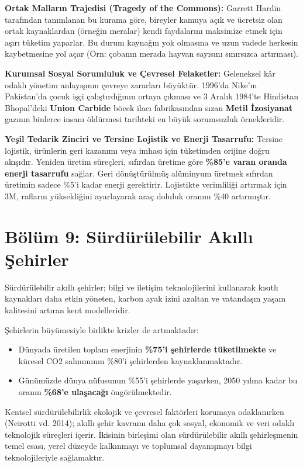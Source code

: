 \documentclass[11pt,a4paper,openany]{book}
\begin{document}
\textbf{Ortak Malların Trajedisi (Tragedy of the Commons):} Garrett Hardin tarafından tanımlanan bu kurama göre, bireyler kamuya açık ve ücretsiz olan ortak kaynaklardan (örneğin meralar) kendi faydalarını maksimize etmek için aşırı tüketim yaparlar. Bu durum kaynağın yok olmasına ve uzun vadede herkesin kaybetmesine yol açar (Örn: çobanın merada hayvan sayısını sınırsızca artırması).

\textbf{Kurumsal Sosyal Sorumluluk ve Çevresel Felaketler:} Geleneksel kâr odaklı yönetim anlayışının çevreye zararları büyüktür. 1996'da Nike'ın Pakistan'da çocuk işçi çalıştırdığının ortaya çıkması ve 3 Aralık 1984'te Hindistan Bhopal'deki \textbf{Union Carbide} böcek ilacı fabrikasından sızan \textbf{Metil İzosiyanat} gazının binlerce insanı öldürmesi tarihteki en büyük sorumsuzluk örnekleridir.

\textbf{Yeşil Tedarik Zinciri ve Tersine Lojistik ve Enerji Tasarrufu:} Tersine lojistik, ürünlerin geri kazanımı veya imhası için tüketimden orijine doğru akışıdır. Yeniden üretim süreçleri, sıfırdan üretime göre \textbf{\%85'e varan oranda enerji tasarrufu} sağlar. Geri dönüştürülmüş alüminyum üretmek sıfırdan üretimin sadece \%5'i kadar enerji gerektirir. Lojistikte verimliliği artırmak için 3M, rafların yüksekliğini ayarlayarak araç doluluk oranını \%40 artırmıştır.

\needspace{9cm}
\section{Bölüm 9: Sürdürülebilir Akıllı Şehirler}
Sürdürülebilir akıllı şehirler; bilgi ve iletişim teknolojilerini kullanarak kısıtlı kaynakları daha etkin yöneten, karbon ayak izini azaltan ve vatandaşın yaşam kalitesini artıran kent modelleridir.

Şehirlerin büyümesiyle birlikte krizler de artmaktadır:
\begin{itemize}
    \item Dünyada üretilen toplam enerjinin \textbf{\%75'i şehirlerde tüketilmekte} ve küresel CO2 salınımının \%80'i şehirlerden kaynaklanmaktadır.
    \item Günümüzde dünya nüfusunun \%55'i şehirlerde yaşarken, 2050 yılına kadar bu oranın \textbf{\%68'e ulaşacağı} öngörülmektedir.
\end{itemize}

Kentsel sürdürülebilirlik ekolojik ve çevresel faktörleri korumaya odaklanırken (Neirotti vd. 2014); akıllı şehir kavramı daha çok sosyal, ekonomik ve veri odaklı teknolojik süreçleri içerir. İkisinin birleşimi olan sürdürülebilir akıllı şehirleşmenin temel esası, yerel düzeyde kalkınmayı ve toplumsal dayanışmayı bilgi teknolojileriyle sağlamaktır.
\end{document}
